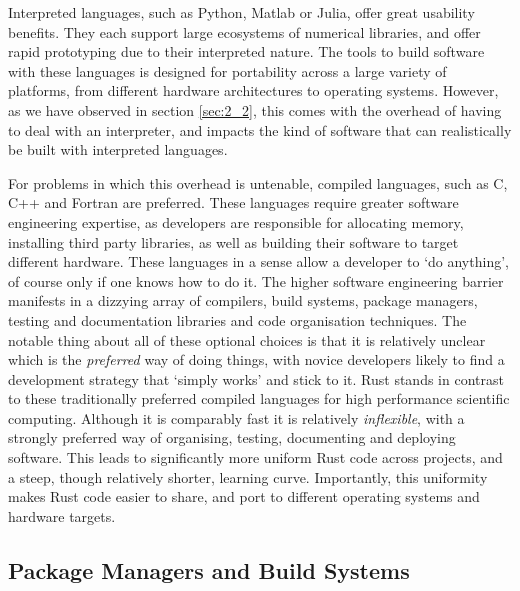 Interpreted languages, such as Python, Matlab or Julia, offer great usability benefits. They each support large ecosystems of numerical libraries, and offer rapid prototyping due to their interpreted nature. The tools to build software with these languages is designed for portability across a large variety of platforms, from different hardware architectures to operating systems. However, as we have observed in section \ref{sec:2_2}, this comes with the overhead of having to deal with an interpreter, and impacts the kind of software that can realistically be built with interpreted languages.

For problems in which this overhead is untenable, compiled languages, such as C, C++ and Fortran are preferred. These languages require greater software engineering expertise, as developers are responsible for allocating memory, installing third party libraries, as well as building their software to target different hardware. These languages in a sense allow a developer to `do anything', of course only if one knows how to do it. The higher software engineering barrier manifests in a dizzying array of compilers, build systems, package managers, testing and documentation libraries and code organisation techniques. The notable thing about all of these optional choices is that it is relatively unclear which is the \textit{preferred} way of doing things, with novice developers likely to find a development strategy that `simply works' and stick to it. Rust stands in contrast to these traditionally preferred compiled languages for high performance scientific computing. Although it is comparably fast it is relatively \textit{inflexible}, with a strongly preferred way of organising, testing, documenting and deploying software. This leads to significantly more uniform Rust code across projects, and a steep, though relatively shorter, learning curve. Importantly, this uniformity makes Rust code easier to share, and port to different operating systems and hardware targets.

\subsection*{Package Managers and Build Systems}

